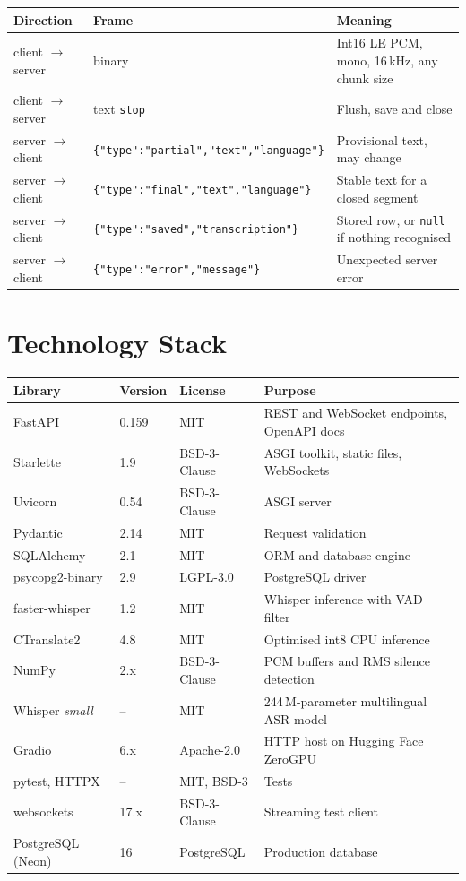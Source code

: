 \documentclass[11pt,a4paper]{article}
\begin{document}
\begin{table}[H]
\centering
\begin{tabularx}{\linewidth}{@{}llX@{}}
\toprule
\textbf{Direction} & \textbf{Frame} & \textbf{Meaning}\\
\midrule
client $\to$ server & binary & Int16 LE PCM, mono, 16\,kHz, any chunk size\\
client $\to$ server & text \texttt{stop} & Flush, save and close\\
server $\to$ client & \texttt{\{"type":"partial","text","language"\}} & Provisional text, may change\\
server $\to$ client & \texttt{\{"type":"final","text","language"\}} & Stable text for a closed segment\\
server $\to$ client & \texttt{\{"type":"saved","transcription"\}} & Stored row, or \texttt{null} if nothing recognised\\
server $\to$ client & \texttt{\{"type":"error","message"\}} & Unexpected server error\\
\bottomrule
\end{tabularx}
\end{table}

\section{Technology Stack}
\begin{longtable}{@{}p{3.4cm}p{1.6cm}p{2.4cm}p{7.2cm}@{}}
\toprule
\textbf{Library} & \textbf{Version} & \textbf{License} & \textbf{Purpose}\\
\midrule
\endhead
FastAPI & 0.159 & MIT & REST and WebSocket endpoints, OpenAPI docs\\
Starlette & 1.9 & BSD-3-Clause & ASGI toolkit, static files, WebSockets\\
Uvicorn & 0.54 & BSD-3-Clause & ASGI server\\
Pydantic & 2.14 & MIT & Request validation\\
SQLAlchemy & 2.1 & MIT & ORM and database engine\\
psycopg2-binary & 2.9 & LGPL-3.0 & PostgreSQL driver\\
faster-whisper & 1.2 & MIT & Whisper inference with VAD filter\\
CTranslate2 & 4.8 & MIT & Optimised int8 CPU inference\\
NumPy & 2.x & BSD-3-Clause & PCM buffers and RMS silence detection\\
Whisper \emph{small} & -- & MIT & 244\,M-parameter multilingual ASR model\\
Gradio & 6.x & Apache-2.0 & HTTP host on Hugging Face ZeroGPU\\
pytest, HTTPX & -- & MIT, BSD-3 & Tests\\
websockets & 17.x & BSD-3-Clause & Streaming test client\\
PostgreSQL (Neon) & 16 & PostgreSQL & Production database\\
\bottomrule
\end{longtable}
\end{document}
